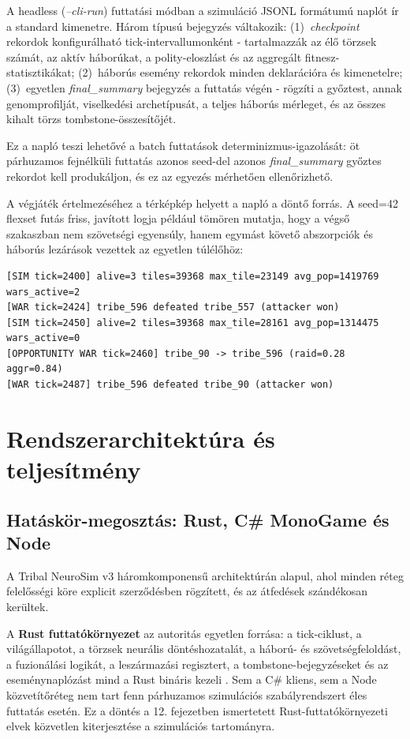 A headless (\textit{--cli-run}) futtatási módban a szimuláció JSONL formátumú naplót ír
a standard kimenetre. Három típusú bejegyzés váltakozik:
(1)~\textit{checkpoint} rekordok konfigurálható tick-intervallumonként - tartalmazzák
az élő törzsek számát, az aktív háborúkat, a polity-eloszlást és az aggregált
fitnesz-statisztikákat;
(2)~háborús esemény rekordok minden deklarációra és kimenetelre;
(3)~egyetlen \textit{final\_summary} bejegyzés a futtatás végén - rögzíti a győztest,
annak genomprofilját, viselkedési archetípusát, a teljes háborús mérleget, és
az összes kihalt törzs tombstone-összesítőjét.

Ez a napló teszi lehetővé a batch futtatások determinizmus-igazolását: öt párhuzamos
fejnélküli futtatás azonos seed-del azonos \textit{final\_summary} győztes rekordot kell
produkáljon, és ez az egyezés mérhetően ellenőrizhető.

A végjáték értelmezéséhez a térképkép helyett a napló a döntő forrás. A seed=42
flexset futás friss, javított logja például tömören mutatja, hogy a végső szakaszban
nem szövetségi egyensúly, hanem egymást követő abszorpciók és háborús lezárások vezettek
az egyetlen túlélőhöz:

\begin{lstlisting}[language={},caption={Flexset seed=42 végjáték-részlet a javított futás logjából}]
[SIM tick=2400] alive=3 tiles=39368 max_tile=23149 avg_pop=1419769 wars_active=2
[WAR tick=2424] tribe_596 defeated tribe_557 (attacker won)
[SIM tick=2450] alive=2 tiles=39368 max_tile=28161 avg_pop=1314475 wars_active=0
[OPPORTUNITY WAR tick=2460] tribe_90 -> tribe_596 (raid=0.28 aggr=0.84)
[WAR tick=2487] tribe_596 defeated tribe_90 (attacker won)
\end{lstlisting}

\section{Rendszerarchitektúra és teljesítmény}
\label{sec:neurosim-24-architecture}

\subsection*{Hatáskör-megosztás: Rust, C\# MonoGame és Node}

A Tribal NeuroSim v3 háromkomponensű architektúrán alapul, ahol minden réteg
felelősségi köre explicit szerződésben rögzített, és az átfedések szándékosan kerültek.

A \textbf{Rust futtatókörnyezet} az autoritás egyetlen forrása: a tick-ciklust,
a világállapotot, a törzsek neurális döntéshozatalát, a háború- és szövetségfeloldást,
a fuzionálási logikát, a leszármazási regisztert, a tombstone-bejegyzéseket
és az eseménynaplózást mind a Rust bináris kezeli \cite{jung2020}.
Sem a C\# kliens, sem a Node közvetítőréteg nem tart fenn párhuzamos
szimulációs szabályrendszert éles futtatás esetén.
Ez a döntés a 12. fejezetben ismertetett Rust-futtatókörnyezeti elvek közvetlen
kiterjesztése a szimulációs tartományra.

